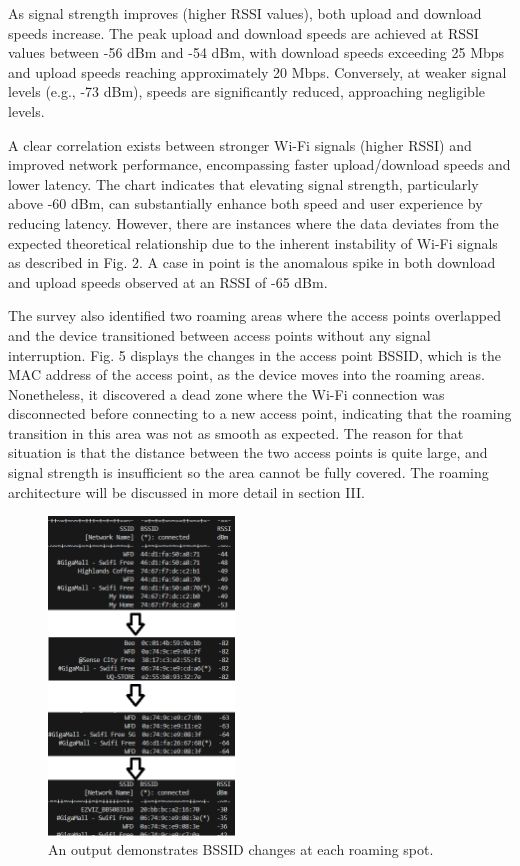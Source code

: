 \documentclass[conference]{IEEEtran}
\begin{document}
As signal strength improves (higher RSSI values), both upload and download speeds increase. The peak upload and download speeds are achieved at RSSI values between -56 dBm and -54 dBm, with download speeds exceeding 25 Mbps and upload speeds reaching approximately 20 Mbps. Conversely, at weaker signal levels (e.g., -73 dBm), speeds are significantly reduced, approaching negligible levels. 

A clear correlation exists between stronger Wi-Fi signals (higher RSSI) and improved network performance, encompassing faster upload/download speeds and lower latency. The chart indicates that elevating signal strength, particularly above -60 dBm, can substantially enhance both speed and user experience by reducing latency. However, there are instances where the data deviates from the expected theoretical relationship due to the inherent instability of Wi-Fi signals as described in Fig. 2. A case in point is the anomalous spike in both download and upload speeds observed at an RSSI of -65 dBm.

The survey also identified two roaming areas where the access points overlapped and the device transitioned between access points without any signal interruption. Fig. 5 displays the changes in the access point BSSID, which is the MAC address of the access point, as the device moves into the roaming areas. Nonetheless, it discovered a dead zone where the Wi-Fi connection was disconnected before connecting to a new access point, indicating that the roaming transition in this area was not as smooth as expected. The reason for that situation is that the distance between the two access points is quite large, and signal strength is insufficient so the area cannot be fully covered. The roaming architecture will be discussed in more detail in section III.

\begin{figure}[htbp]
    \centering
    \includegraphics[width=0.44\textwidth]{fig5_rssid_change.png}
    \caption{An output demonstrates BSSID changes at each roaming spot.}
\end{figure}
\end{document}
